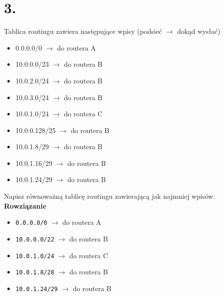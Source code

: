 \documentclass{article}
\begin{document}
\section*{3.}
Tablica routingu zawiera następujące wpisy (podsieć $\rightarrow$ dokąd wysłać)
\begin{itemize}
    \item 0.0.0.0/0 $\rightarrow$ do routera A
    \item 10.0.0.0/23 $\rightarrow$ do routera B
    \item 10.0.2.0/24 $\rightarrow$ do routera B
    \item 10.0.3.0/24 $\rightarrow$ do routera B
    \item 10.0.1.0/24 $\rightarrow$ do routera C
    \item 10.0.0.128/25 $\rightarrow$ do routera B
    \item 10.0.1.8/29 $\rightarrow$ do routera B
    \item 10.0.1.16/29 $\rightarrow$ do routera B
    \item 10.0.1.24/29 $\rightarrow$ do routera B
\end{itemize}
Napisz równoważną tablicę routingu zawierającą jak najmniej wpisów.
\newline \textbf{Rowziązanie}
\begin{itemize}
    \item \texttt{0.0.0.0/0} $\rightarrow$ do routera A
    \item \texttt{10.0.0.0/22} $\rightarrow$ do routera B
    \item \texttt{10.0.1.0/24} $\rightarrow$ do routera C
    \item \texttt{10.0.1.8/28} $\rightarrow$ do routera B
    \item \texttt{10.0.1.24/29} $\rightarrow$ do routera B
\end{itemize}
\end{document}
